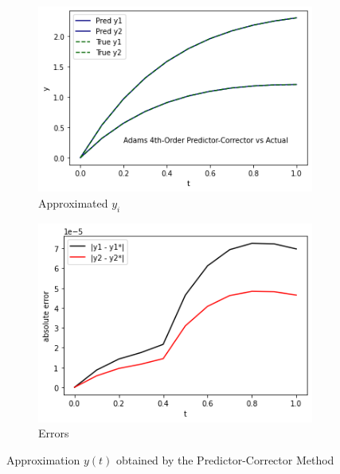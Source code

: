 \documentclass[12pt,oneside]{book}
\begin{document}
		\begin{figure}[h!]
			\centering
			\begin{subfigure}[h]{0.47\textwidth}
				\centering
				\includegraphics[width=\textwidth]{apc4}
				\caption{Approximated $ y_{i} $}
			\end{subfigure}
			\hfill
			\begin{subfigure}[h]{0.47\textwidth}
				\centering
				\includegraphics[width=\textwidth]{apc4_err}
				\caption{Errors}
			\end{subfigure}
			\caption{Approximation $ y(t) $ obtained by the Predictor-Corrector Method}
			\label{fig:pc4}
		\end{figure}

\clearpage
\end{document}
